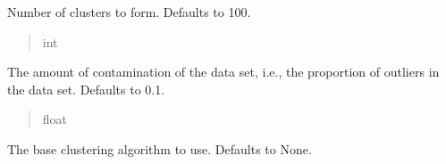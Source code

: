 \documentclass[letterpaper,10pt,english]{sphinxmanual}
\begin{document}
\begin{fulllineitems}
\begin{fulllineitems}
\label{\detokenize{application.algorithms.cblof:application.algorithms.cblof.CblofConfiguration.CblofConfiguration.n_clusters}}
\pysigstartsignatures
{}
\pysigstopsignatures
\sphinxAtStartPar
Number of clusters to form. Defaults to 100.
\begin{quote}\begin{description}
\sphinxAtStartPar
int

\end{description}\end{quote}

\end{fulllineitems}


\begin{fulllineitems}
\label{\detokenize{application.algorithms.cblof:application.algorithms.cblof.CblofConfiguration.CblofConfiguration.contamination}}
\pysigstartsignatures
{}
\pysigstopsignatures
\sphinxAtStartPar
The amount of contamination of the data set, i.e., the proportion of outliers in the data set. Defaults to 0.1.
\begin{quote}\begin{description}
\sphinxAtStartPar
float

\end{description}\end{quote}

\end{fulllineitems}


\begin{fulllineitems}
\label{\detokenize{application.algorithms.cblof:application.algorithms.cblof.CblofConfiguration.CblofConfiguration.clustering_estimator}}
\pysigstartsignatures
{}
\pysigstopsignatures
\sphinxAtStartPar
The base clustering algorithm to use. Defaults to None.


\end{fulllineitems}
\end{fulllineitems}
\end{document}

